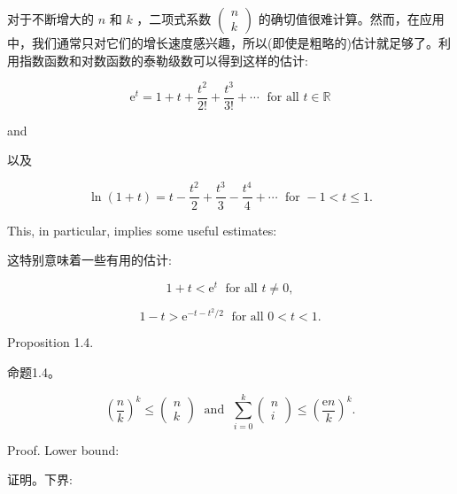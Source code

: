 \documentclass[10pt]{article}
\begin{document}
\begin{tcolorbox}\relax
对于不断增大的 \(n\) 和 \(k\) ，二项式系数 \(\left( \begin{array}{l} n \\  k \end{array}\right)\) 的确切值很难计算。然而，在应用中，我们通常只对它们的增长速度感兴趣，所以(即使是粗略的)估计就足够了。利用指数函数和对数函数的泰勒级数可以得到这样的估计:
\end{tcolorbox}

\[
{\mathrm{e}}^{t} = 1 + t + \frac{{t}^{2}}{2!} + \frac{{t}^{3}}{3!} + \cdots \;\text{ for all }t \in  \mathbb{R} \tag{1.2}
\]

and

\begin{tcolorbox}\relax
以及
\end{tcolorbox}

\[
\ln \left( {1 + t}\right)  = t - \frac{{t}^{2}}{2} + \frac{{t}^{3}}{3} - \frac{{t}^{4}}{4} + \cdots \;\text{ for } - 1 < t \leq  1. \tag{1.3}
\]

This, in particular, implies some useful estimates:

\begin{tcolorbox}\relax
这特别意味着一些有用的估计:
\end{tcolorbox}

\[
1 + t < {\mathrm{e}}^{t}\;\text{ for all }t \neq  0, \tag{1.4}
\]

\[
1 - t > {\mathrm{e}}^{-t - {t}^{2}/2}\;\text{ for all }0 < t < 1. \tag{1.5}
\]

Proposition 1.4.

\begin{tcolorbox}\relax
命题1.4。
\end{tcolorbox}

\[
{\left( \frac{n}{k}\right) }^{k} \leq  \left( \begin{array}{l} n \\  k \end{array}\right) \;\text{ and }\;\mathop{\sum }\limits_{{i = 0}}^{k}\left( \begin{array}{l} n \\  i \end{array}\right)  \leq  {\left( \frac{\mathrm{e}n}{k}\right) }^{k}. \tag{1.6}
\]

Proof. Lower bound:

\begin{tcolorbox}\relax
证明。下界:
\end{tcolorbox}
\end{document}
